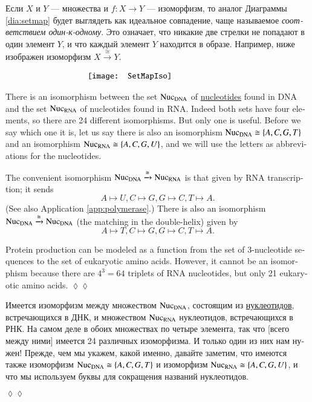 \documentclass{book}
\def\tn{\textnormal}
\def\to{\rightarrow}
\def\taking{\colon}
\def\iso{\cong}
\newcommand{\To}[1]{\xrightarrow{#1}}
\theoremstyle{theoremENG}
\theoremstyle{lemmaENG}
\theoremstyle{propositionENG}
\theoremstyle{corollaryENG}
\theoremstyle{factENG}
\theoremstyle{remarkENG}
\theoremstyle{exampleENG}
\theoremstyle{warningENG}
\theoremstyle{questionENG}
\theoremstyle{guessENG}
\theoremstyle{answerENG}
\theoremstyle{constructionENG}
\theoremstyle{rulesENG}
\theoremstyle{excENG}
\theoremstyle{appENG}
\newtheorem{appENG}[subsubsection]{\begin{english}Application\end{english}}
\theoremstyle{definitionENG}
\theoremstyle{notationENG}
\theoremstyle{conjectureENG}
\theoremstyle{postulateENG}
\newenvironment{applicationENG}{\begin{appENG}}{\hspace*{\fill}$\lozenge\lozenge$\end{appENG}}
\theoremstyle{theoremRUS}
\theoremstyle{lemmaRUS}
\theoremstyle{propositionRUS}
\theoremstyle{corollaryRUS}
\theoremstyle{factRUS}
\theoremstyle{remarkRUS}
\theoremstyle{exampleRUS}
\newtheorem{exampleRUS}[subsubsection]{\begin{russian}Пример\end{russian}}
\theoremstyle{warningRUS}
\theoremstyle{questionRUS}
\theoremstyle{guessRUS}
\theoremstyle{answerRUS}
\theoremstyle{constructionRUS}
\theoremstyle{rulesRUS}
\theoremstyle{excRUS}
\theoremstyle{appRUS}
\newtheorem{appRUS}[subsubsection]{\begin{russian}Прикладной пример (применение)\end{russian}}
\theoremstyle{definitionRUS}
\theoremstyle{notationRUS}
\theoremstyle{conjectureRUS}
\theoremstyle{postulateRUS}
\newenvironment{applicationRUS}{\begin{appRUS}}{\hspace*{\fill}$\lozenge\lozenge$\end{appRUS}}
\begin{document}
\begin{english}
\begin{exampleRUS}
\begin{russian}
Если $X$ и $Y$ — множества и $f\taking X\to Y$ — изоморфизм, то аналог Диаграммы \ref{dia:setmap} будет выглядеть как идеальное совпадение, чаще называемое {\em соответствием один-к-одному}. Это означает, что никакие две стрелки не попадают в один элемент $Y$, и что каждый элемент $Y$ находится в образе. Например, ниже изображен изоморфизм $X\To{\iso}Y$.
\end{russian}
\end{exampleRUS}

\begin{align}\label{dia:setmapiso}
\parbox{2.3in}{\texttt{[image: SetMapIso]}}
\end{align}

\begin{applicationENG}\label{app:DNA RNA}
There is an isomorphism between the set $\tn{Nuc}_\tn{DNA}$ of \href{http://en.wikipedia.org/wiki/Nucleotides}{\text nucleotides} found in DNA and the set $\tn{Nuc}_\tn{RNA}$ of nucleotides found in RNA. Indeed both sets have four elements, so there are 24 different isomorphisms. But only one is useful. Before we say which one it is, let us say there is also an isomorphism $\tn{Nuc}_\tn{DNA}\iso\{A,C,G,T\}$ and an isomorphism $\tn{Nuc}_\tn{RNA}\iso\{A,C,G,U\}$, and we will use the letters as abbreviations for the nucleotides. 

The convenient isomorphism $\tn{Nuc}_\tn{DNA}\To{\iso}\tn{Nuc}_\tn{RNA}$ is that given by RNA transcription; it sends 
$$A\mapsto U, C\mapsto G, G\mapsto C, T\mapsto A.$$ 
(See also Application \ref{app:polymerase}.) There is also an isomorphism $\tn{Nuc}_\tn{DNA}\To{\iso}\tn{Nuc}_\tn{DNA}$ (the matching in the double-helix) given by 
$$A\mapsto T, C\mapsto G, G\mapsto C, T\mapsto A.$$

Protein production can be modeled as a function from the set of 3-nucleotide sequences to the set of eukaryotic amino acids. However, it cannot be an isomorphism because there are $4^3=64$ triplets of RNA nucleotides, but only 21 eukaryotic amino acids. 
\end{applicationENG}

\begin{applicationRUS}\label{app:DNA RNA}
\begin{russian}Имеется изоморфизм между множеством $\tn{Nuc}_\tn{DNA}$, состоящим из  \href{https://ru.wikipedia.org/wiki/%D0%9D%D1%83%D0%BA%D0%BB%D0%B5%D0%BE%D1%82%D0%B8%D0%B4%D1%8B}{\text нуклеотидов}, встречающихся в ДНК, и множеством $\tn{Nuc}_\tn{RNA}$ нуклеотидов, встречающихся в РНК. На самом деле в обоих множествах по четыре элемента, так что [всего между ними] имеется 24 различных изоморфизма. И только один из них нам нужен! Прежде, чем мы укажем, какой именно, давайте заметим, что имеются также изоморфизм $\tn{Nuc}_\tn{DNA}\iso\{A,C,G,T\}$ и изоморфизм $\tn{Nuc}_\tn{RNA}\iso\{A,C,G,U\}$, и что мы используем буквы для сокращения названий нуклеотидов. \end{russian}


\end{applicationRUS}
\end{english}
\end{document}
